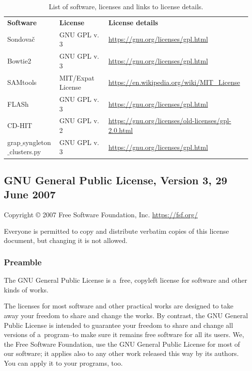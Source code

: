\documentclass[a4paper, 11pt, twoside]{article}
\begin{document}
\begin{longtable}{| >{\centering\arraybackslash}m{2.5cm} >{\centering\arraybackslash}m{3.4cm} >{\centering\arraybackslash}m{8.8cm} |}
\caption[List of software and licenses]{List of software, licenses and links to license details.}\\
\hline
\endhead
\hline
\endfoot
\textbf{Software} & \textbf{License} & \textbf{License details}\\
Sondovač & GNU GPL v. 3 & \url{https://gnu.org/licenses/gpl.html}\\
Bowtie2 & GNU GPL v. 3 & \url{https://gnu.org/licenses/gpl.html}\\
SAMtools & MIT/Expat License & \url{https://en.wikipedia.org/wiki/MIT_License}\\
FLASh & GNU GPL v. 3 & \url{https://gnu.org/licenses/gpl.html}\\
CD-HIT & GNU GPL v. 2 & \url{https://gnu.org/licenses/old-licenses/gpl-2.0.html}\\
grap$\_$synglet\-on$\_$clusters.py & GNU GPL v. 3 & \url{https://gnu.org/licenses/gpl.html}
\label{software-lic}
\end{longtable}

\begingroup
\fontsize{7pt}{8pt}
\selectfont

\subsection{GNU General Public License, Version 3, 29 June 2007}

Copyright © 2007 Free Software Foundation, Inc. \url{https://fsf.org/}

Everyone is permitted to copy and distribute verbatim copies of this license document, but changing it is not allowed.

\subsubsection{Preamble}

The GNU General Public License is a~free, copyleft license for software and other kinds of works.

The licenses for most software and other practical works are designed to take away your freedom to share and change the works. By contrast, the GNU General Public License is intended to guarantee your freedom to share and change all versions of a~program--to make sure it remains free software for all its users. We, the Free Software Foundation, use the GNU General Public License for most of our software; it applies also to any other work released this way by its authors. You can apply it to your programs, too.
\end{document}
